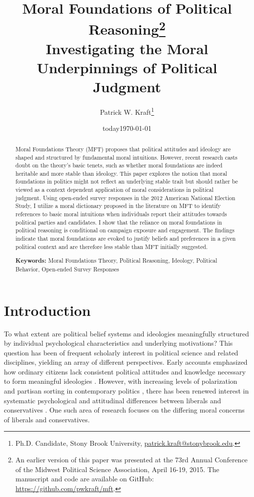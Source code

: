 \documentclass[12pt]{article}
\author{Patrick W. Kraft\footnote{Ph.D. Candidate, Stony Brook University, \href{mailto:patrick.kraft@stonybrook.edu}{patrick.kraft@stonybrook.edu}.
}}
\date{today}
\title{Moral Foundations of Political Reasoning\footnote{An earlier version of this paper was presented at the 73rd Annual Conference of the Midwest Political Science Association, April 16-19, 2015. The manuscript and code are available on GitHub: \url{https://github.com/pwkraft/mft}.}\\
\large{Investigating the Moral Underpinnings of Political Judgment}}
\date{\today}
\begin{document}
\maketitle
\onehalfspacing

\begin{abstract}
Moral Foundations Theory (MFT) proposes that political attitudes and ideology are shaped and structured by fundamental moral intuitions. However, recent research casts doubt on the theory's basic tenets, such as whether moral foundations are indeed heritable and more stable than ideology. This paper explores the notion that moral foundations in politics might not reflect an underlying stable trait but should rather be viewed as a context dependent application of moral considerations in political judgment. Using open-ended survey responses in the 2012 American National Election Study, I utilize a moral dictionary proposed in the literature on MFT to identify references to basic moral intuitions when individuals report their attitudes towards political parties and candidates. I show that the reliance on moral foundations in political reasoning is conditional on campaign exposure and engagement. The findings indicate that moral foundations are evoked to justify beliefs and preferences in a given political context and are therefore less stable than MFT initially suggested.

\vspace{\baselineskip}
\noindent \textbf{Keywords:} Moral Foundations Theory, Political Reasoning, Ideology, Political Behavior, Open-ended Survey Responses
\end{abstract}
\newpage


\section{Introduction}


To what extent are political belief systems and ideologies meaningfully structured by individual psychological characteristics and underlying motivations? This question has been of frequent scholarly interest in political science and related disciplines, yielding an array of different perspectives. Early accounts emphasized how ordinary citizens lack consistent political attitudes and knowledge necessary to form meaningful ideologies \citep[e.g.][]{converse1964nature}. However, with increasing levels of polarization and partisan sorting in contemporary politics \citep{iyengar2015fear}, there has been renewed interest in systematic psychological and attitudinal differences between liberals and conservatives \citep{jost2006end}. One such area of research focuses on the differing moral concerns of liberals and conservatives.
\end{document}
